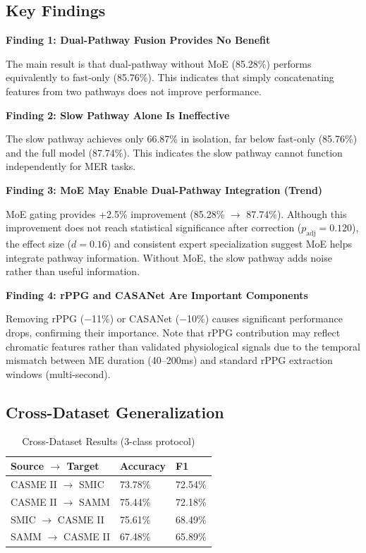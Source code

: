 \documentclass[preprint,12pt,authoryear]{elsarticle}
\begin{document}
\subsection{Key Findings}

\textbf{Finding 1: Dual-Pathway Fusion Provides No Benefit}

The main result is that dual-pathway without MoE (85.28\%) performs equivalently to fast-only (85.76\%). This indicates that simply concatenating features from two pathways does not improve performance.

\textbf{Finding 2: Slow Pathway Alone Is Ineffective}

The slow pathway achieves only 66.87\% in isolation, far below fast-only (85.76\%) and the full model (87.74\%). This indicates the slow pathway cannot function independently for MER tasks.

\textbf{Finding 3: MoE May Enable Dual-Pathway Integration (Trend)}

MoE gating provides +2.5\% improvement (85.28\% $\rightarrow$ 87.74\%). Although this improvement does not reach statistical significance after correction ($p_{\text{adj}}=0.120$), the effect size ($d=0.16$) and consistent expert specialization suggest MoE helps integrate pathway information. Without MoE, the slow pathway adds noise rather than useful information.

\textbf{Finding 4: rPPG and CASANet Are Important Components}

Removing rPPG ($-$11\%) or CASANet ($-$10\%) causes significant performance drops, confirming their importance. Note that rPPG contribution may reflect chromatic features rather than validated physiological signals due to the temporal mismatch between ME duration (40--200ms) and standard rPPG extraction windows (multi-second).

\subsection{Cross-Dataset Generalization}

\begin{table}[htbp]
\centering
\caption{Cross-Dataset Results (3-class protocol)}
\label{tab:cross_dataset}
\begin{tabular}{lll}
\toprule
\textbf{Source $\rightarrow$ Target} & \textbf{Accuracy} & \textbf{F1} \\
\midrule
CASME II $\rightarrow$ SMIC & 73.78\% & 72.54\% \\
CASME II $\rightarrow$ SAMM & 75.44\% & 72.18\% \\
SMIC $\rightarrow$ CASME II & 75.61\% & 68.49\% \\
SAMM $\rightarrow$ CASME II & 67.48\% & 65.89\% \\
\bottomrule
\end{tabular}
\end{table}
\end{document}
